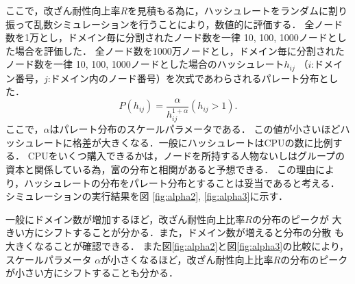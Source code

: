 \documentclass[a4paper,12pt]{jsarticle}
\begin{document}
ここで，改ざん耐性向上率$R$を見積もる為に，ハッシュレートをランダムに割り振って乱数シミュレーションを行うことにより，数値的に評価する．
全ノード数を1万とし，ドメイン毎に分割されたノード数を一律 10, 100, 1000ノードとした場合を評価した．
全ノード数を1000万ノードとし，ドメイン毎に分割されたノード数を一律 10, 100, 1000ノードとした場合のハッシュレート$ h_{ij} $ （$i$:ドメイン番号，$j$:ドメイン内のノード番号）を次式であわらされるパレート分布とした．
%
\begin{equation}
	P(h_{ij}) = \frac{\alpha}{h_{ij}^{1+\alpha}} (h_{ij} > 1).
\end{equation}
%
ここで，$\alpha$はパレート分布のスケールパラメータである．
この値が小さいほどハッシュレートに格差が大きくなる．一般にハッシュレートはCPUの数に比例する．
CPUをいくつ購入できるかは，ノードを所持する人物ないしはグループの資本と関係している為，富の分布と相関があると予想できる．
この理由により，ハッシュレートの分布をパレート分布とすることは妥当であると考える．
シミュレーションの実行結果を図 \ref{fig:alpha2}, \ref{fig:alpha3}に示す．

一般にドメイン数が増加するほど，改ざん耐性向上比率$R$の分布のピークが
大きい方にシフトすることが分かる．また，ドメイン数が増えると分布の分散
も大きくなることが確認できる．
また図\ref{fig:alpha2}と図\ref{fig:alpha3}の比較により，スケールパラメータ
$\alpha$が小さくなるほど，改ざん耐性向上比率$R$の分布のピークが小さい方にシフトすることも分かる．
\end{document}
